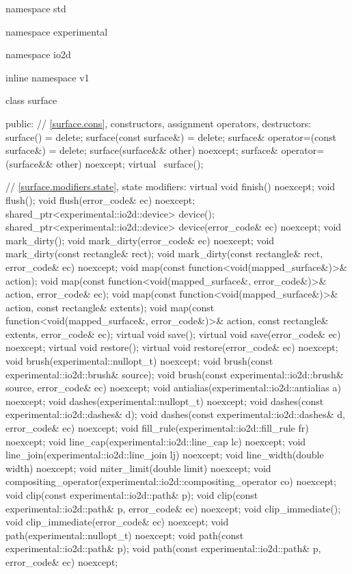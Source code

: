 \begin{codeblock}
namespace std { namespace experimental { namespace io2d { inline namespace v1 {
  class surface {
  public:
    // \ref{surface.cons}, constructors, assignment operators, destructors:
    surface() = delete;
    surface(const surface&) = delete;
    surface& operator=(const surface&) = delete;
    surface(surface&& other) noexcept;
    surface& operator=(surface&& other) noexcept;
    virtual ~surface();

    // \ref{surface.modifiers.state}, state modifiers:
    virtual void finish() noexcept;
    void flush();
    void flush(error_code& ec) noexcept;
    shared_ptr<experimental::io2d::device> device();
    shared_ptr<experimental::io2d::device> device(error_code& ec) noexcept;
    void mark_dirty();
    void mark_dirty(error_code& ec) noexcept;
    void mark_dirty(const rectangle& rect);
    void mark_dirty(const rectangle& rect, error_code& ec) noexcept;
    void map(const function<void(mapped_surface&)>& action);
    void map(const function<void(mapped_surface&, error_code&)>& action,
      error_code& ec);
    void map(const function<void(mapped_surface&)>& action,
      const rectangle& extents);
    void map(const function<void(mapped_surface&, error_code&)>& action,
      const rectangle& extents, error_code& ec);
    virtual void save();
    virtual void save(error_code& ec) noexcept;
    virtual void restore();
    virtual void restore(error_code& ec) noexcept;
    void brush(experimental::nullopt_t) noexcept;
    void brush(const experimental::io2d::brush& source);
    void brush(const experimental::io2d::brush& source, error_code& ec)
      noexcept;
    void antialias(experimental::io2d::antialias a) noexcept;
    void dashes(experimental::nullopt_t) noexcept;
    void dashes(const experimental::io2d::dashes& d);
    void dashes(const experimental::io2d::dashes& d, error_code& ec) noexcept;
    void fill_rule(experimental::io2d::fill_rule fr) noexcept;
    void line_cap(experimental::io2d::line_cap lc) noexcept;
    void line_join(experimental::io2d::line_join lj) noexcept;
    void line_width(double width) noexcept;
    void miter_limit(double limit) noexcept;
    void compositing_operator(experimental::io2d::compositing_operator co)
      noexcept;
    void clip(const experimental::io2d::path& p);
    void clip(const experimental::io2d::path& p, error_code& ec) noexcept;
    void clip_immediate();
    void clip_immediate(error_code& ec) noexcept;
    void path(experimental::nullopt_t) noexcept;
    void path(const experimental::io2d::path& p);
    void path(const experimental::io2d::path& p, error_code& ec) noexcept;

}}}}}
\end{codeblock}
